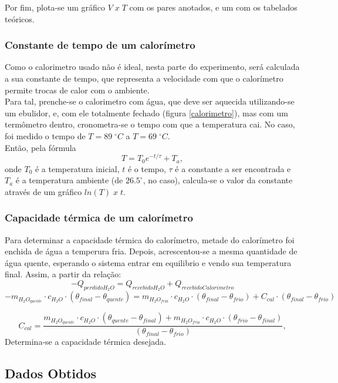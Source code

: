 \documentclass[12pt,a4paper]{article}
\begin{document}
Por fim, plota-se um gráfico $V \; x \; T$ com os pares anotados, e um com os tabelados teóricos.\\

\subsubsection{Constante de tempo de um calorímetro}

Como o calorimetro usado não é ideal, nesta parte do experimento, será calculada a sua constante de tempo, que representa a velocidade com que o calorímetro permite trocas de calor com o ambiente.\\
Para tal, prenche-se o calorimetro com água, que deve ser aquecida utilizando-se um ebulidor, e, com ele totalmente fechado (figura \ref{calorimetro}), mas com um termômetro dentro, cronometra-se o tempo com que a temperatura cai. No caso, foi medido o tempo de $T = 89 \; ^{\circ} C$ a $T = 69 \; ^{\circ} C$.\\
Então, pela fórmula 
$$T = T_0 e ^{-t/\tau} + T_a,$$
onde $T_0$ é a temperatura inicial, $t$ é o tempo, $\tau$ é a constante a ser encontrada e $T_a$ é a temperatura ambiente (de $26.5 ^{\circ}$, no caso), calcula-se o valor da constante através de um gráfico $ln(T) \; x \; t$.


\subsubsection{Capacidade térmica de um calorímetro}
Para determinar a capacidade térmica do calorímetro, metade do calorímetro foi enchida de água a temperura fria. Depois, acrescentou-se a mesma quantidade de água quente, esperando o sistema entrar em equilibrio e vendo sua temperatura final. Assim, a partir da relação:
$$-Q_{perdido H_2O} = Q_{recebido H_2O} + Q_{recebido Calorimetro}$$
$$-m_{H_2O_{quente}}\cdot c_{H_2O} \cdot (\theta_{final}-\theta_{quente}) = m_{H_2O_{fria}}\cdot c_{H_2O} \cdot (\theta_{final}-\theta_{frio}) + C_{cal}\cdot (\theta_{final}-\theta_{frio}) $$

$$C_{cal} = \frac{m_{H_2O_{quente}}\cdot c_{H_2O}\cdot(\theta_{quente} - \theta_{final}) + m_{H_2O_{fria}}\cdot c_{H_2O}\cdot(\theta_{frio} - \theta_{final})}{(\theta_{final}-\theta_{frio})},$$
Determina-se a capacidade térmica desejada.


\subsection{Dados Obtidos}
\end{document}
